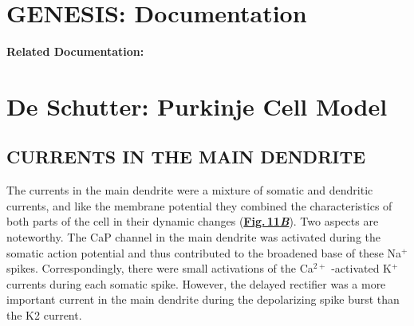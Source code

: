 \documentclass[12pt]{article}
\begin{document}
\section*{GENESIS: Documentation}

{\bf Related Documentation:}

\section*{De Schutter: Purkinje Cell Model}

\subsection*{CURRENTS IN THE MAIN DENDRITE}

The currents in the main dendrite were a mixture of somatic and dendritic
currents, and like the membrane potential they combined
the characteristics of both parts of the cell in their dynamic
changes (\href{../pub-purkinje-deschutter1-fig-11/pub-purkinje-deschutter1-fig-11.tex}{\bf Fig.\,11{\it B}}). Two aspects are noteworthy. The CaP
channel in the main dendrite was activated during the somatic
action potential and thus contributed to the broadened
base of these Na$^+$ spikes. Correspondingly, there were
small activations of the Ca$^{2+}$ -activated K$^+$ currents during
each somatic spike. However, the delayed rectifier was a
more important current in the main dendrite during the
depolarizing spike burst than the K2 current.



\end{document}
